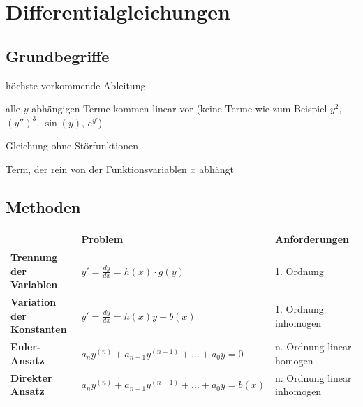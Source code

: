 
\section{Differentialgleichungen}

\subsection{Grundbegriffe}

\begin{description}[labelindent=16pt,style=multiline,leftmargin=3.5cm, noitemsep]
	\item[Ordnung:] h{\"o}chste vorkommende Ableitung
	\item[linear:] alle $y$-abh{\"a}ngigen Terme kommen linear vor (keine Terme wie zum Beispiel $y^2$, $(y'')^3$, $\sin(y)$, $e^{y'}$)
	\item[homogen:] Gleichung ohne St{\"o}rfunktionen
	\item[St{\"o}rfunktion:] Term, der rein von der Funktionsvariablen $x$ abh{\"a}ngt
\end{description}

\subsection{Methoden}

\begin{table}[H]
	\centering
	\begin{tabular}{|p{3cm}|p{6cm}|p{3cm}|}
		\hline
		& \textbf{Problem} 							& \textbf{Anforderungen} 			\\ \hline
		\textbf{Trennung der Variablen}   	& $y' = \frac{dy}{dx} = h(x) \cdot g(y)$ 	& 1. Ordnung			            \\ \hline
		\textbf{Variation der Konstanten}	& $y' = \frac{dy}{dx} = h(x)y + b(x)$	 	& 1. Ordnung \filbreak inhomogen	\\ \hline
		\textbf{Euler-Ansatz}				& $a_{n}y^{(n)} + a_{n-1}y^{(n-1)} + ... + a_{0}y = 0$	 	& n. Ordnung \filbreak linear \filbreak homogen	\\ \hline
		\textbf{Direkter Ansatz}				& $a_{n}y^{(n)} + a_{n-1}y^{(n-1)} + ... + a_{0}y = b(x)$	& n. Ordnung \filbreak linear \filbreak inhomogen	\\ \hline
		
	\end{tabular}
\end{table}

